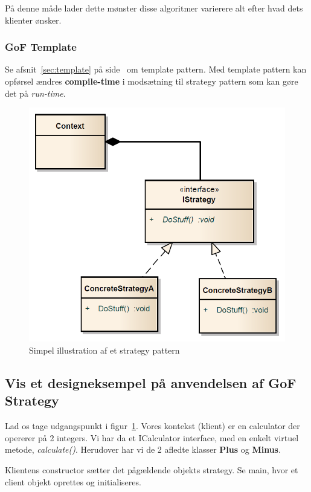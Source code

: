 På denne måde lader dette mønster disse algoritmer varierere alt efter hvad dets klienter ønsker.

\subsubsection{GoF Template}
Se afsnit~\ref{sec:template} på side~\pageref{sec:template} om template pattern. Med template pattern kan opførsel ændres \textbf{compile-time} i modsætning til strategy pattern som kan gøre det på \textit{run-time}.

\begin{figure}[h]
	\centering
	\includegraphics[width=0.6\linewidth]{figs/strategyPattern.PNG}
	\caption[UML for et strategy pattern]{Simpel illustration af et strategy pattern}
	\label{fig:strategyPattern}
\end{figure}

\subsection{Vis et designeksempel på anvendelsen af GoF Strategy}

Lad os tage udgangspunkt i figur~\ref{fig:strategyPattern}. Vores kontekst (klient) er en calculator der opererer på 2 integers.
Vi har da et ICalculator interface, med en enkelt virtuel metode, \textit{calculate()}.
Herudover har vi de 2 afledte klasser \textbf{Plus} og \textbf{Minus}.

Klientens constructor sætter det pågældende objekts strategy. Se main, hvor et client objekt oprettes og initialiseres.

